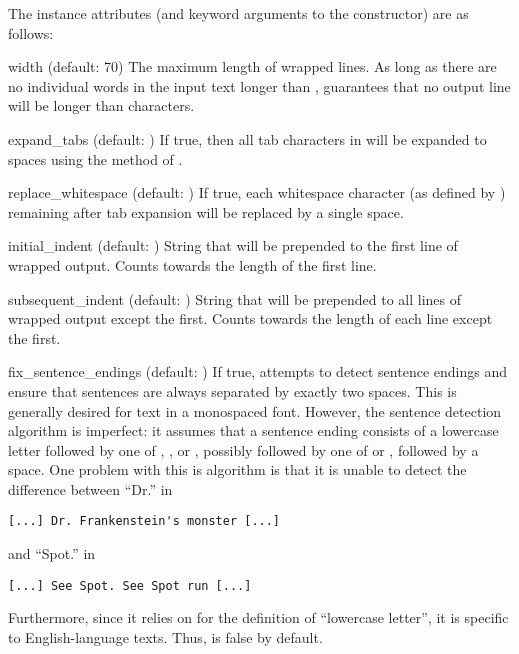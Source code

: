 The  instance attributes (and keyword arguments to
the constructor) are as follows:

\begin{memberdesc}{width}
(default: 70) The maximum length of wrapped lines.  As long as there are
no individual words in the input text longer than ,
 guarantees that no output line will be longer than
 characters.
\end{memberdesc}

\begin{memberdesc}{expand_tabs}
(default: ) If true, then all tab characters in 
will be expanded to spaces using the  method of
.
\end{memberdesc}

\begin{memberdesc}{replace_whitespace}
(default: ) If true, each whitespace character (as defined by
) remaining after tab expansion will be replaced
by a single space.  
\end{memberdesc}

\begin{memberdesc}{initial_indent}
(default: ) String that will be prepended to the first line
of wrapped output.  Counts towards the length of the first line.
\end{memberdesc}

\begin{memberdesc}{subsequent_indent}
(default: ) String that will be prepended to all lines of
wrapped output except the first.  Counts towards the length of each
line except the first.
\end{memberdesc}

\begin{memberdesc}{fix_sentence_endings}
(default: ) If true,  attempts to detect
sentence endings and ensure that sentences are always separated by
exactly two spaces.  This is generally desired for text in a monospaced
font.  However, the sentence detection algorithm is imperfect: it
assumes that a sentence ending consists of a lowercase letter followed
by one of ,
\character{!}, or , possibly followed by one of
 or , followed by a space.  One problem
with this is algorithm is that it is unable to detect the difference
between ``Dr.'' in
\begin{verbatim}
[...] Dr. Frankenstein's monster [...]
\end{verbatim}
and ``Spot.'' in
\begin{verbatim}
[...] See Spot. See Spot run [...]
\end{verbatim}
Furthermore, since it relies on  for the
definition of ``lowercase letter'', it is specific to English-language
texts.  Thus,  is false by default.
\end{memberdesc}

